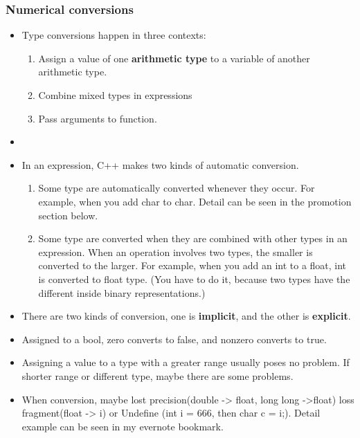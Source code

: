 \documentclass[a4paper,12pt,twoside]{book}
\begin{document}
\subsubsection{Numerical conversions}

\begin{itemize}
\item Type conversions happen in three contexts:
\begin{enumerate}
\item Assign a value of one \textbf{arithmetic type} to a variable of another arithmetic type.
\item Combine mixed types in expressions
\item Pass arguments to function.
\end{enumerate}

\item


\item In an expression, C++ makes two kinds of automatic conversion.
\begin{enumerate}
	\item Some type are automatically converted whenever they occur. For example, when you add char to char. Detail can be seen in the promotion section below.
	
	\item Some type are converted when they are combined with other types in an expression. When an operation involves two types, the smaller is converted to the larger. For example, when you add an int to a float, int is converted to float type. (You have to do it, because two types have the different inside binary representations.)
\end{enumerate}

\item There are two kinds of conversion, one is \textbf{implicit}, and the other is \textbf{explicit}.

\item Assigned to a bool, zero converts to false, and nonzero converts to true.

\item Assigning a value to a type with a greater range usually poses no problem. If shorter range or different type, maybe there are some problems.

\item When conversion, maybe lost precision(double -> float, long long ->float) loss fragment(float -> i) or Undefine (int i = 666, then char c = i;). Detail example can be seen in my evernote bookmark.


\end{itemize}
\end{document}
